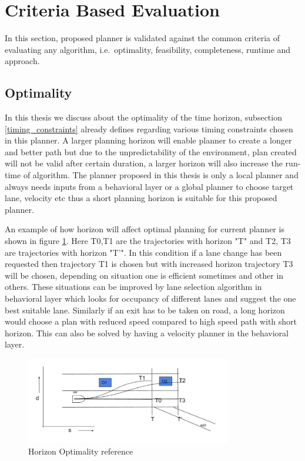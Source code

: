 \section{Criteria Based Evaluation}
\label{criteria_based_eval}
In this section, proposed planner is validated against the common criteria of evaluating any algorithm, i.e.\ optimality, feasibility, completeness, runtime and approach.

\subsection{Optimality}
 In this thesis we discuss about the optimality of the time horizon, subsection \ref{timing_constraints} already defines regarding various timing constraints chosen in this planner. A larger planning horizon will enable planner to create a longer and better path but due to the unpredictability of the environment, plan created will not be valid after certain duration, a larger horizon will also increase the run-time of algorithm. The planner proposed in this thesis is only a local planner and always needs inputs from a behavioral layer or a global planner to choose target lane, velocity etc thus a short planning horizon is suitable for this proposed planner. 
 
 An example of how horizon will affect optimal planning for current planner is shown in figure \ref{horizon_optimality}. Here T0,T1 are the trajectories with horizon "T" and T2, T3 are trajectories with horizon "T'". In this condition if a lane change has been requested then trajectory T1 is chosen but with increased horizon trajectory T3 will be chosen, depending on situation one is efficient sometimes and other in others. These situations can be improved by lane selection algorithm in behavioral layer which looks for occupancy of different lanes and suggest the one best suitable lane. Similarly if an exit has to be taken on road, a long horizon would choose a plan with reduced speed compared to high speed path with short horizon. This can also be solved by having a velocity planner in the behavioral layer.  

\begin{figure}[h]
    \centering
    \includegraphics[width=0.8\textwidth]{Images/horizaon_optimality_2.png}
    \caption{Horizon Optimality reference}
    \label{horizon_optimality}
\end{figure}
 

